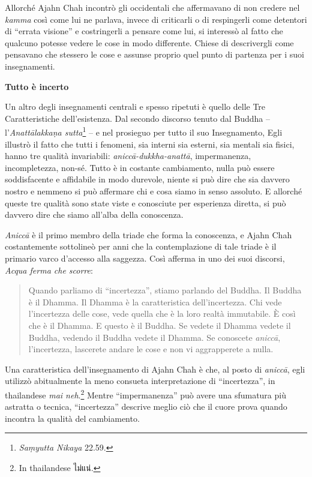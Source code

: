Allorché Ajahn Chah incontrò gli occidentali che affermavano di non
credere nel \emph{kamma} così come lui ne parlava, invece di criticarli
o di respingerli come detentori di ``errata visione'' e costringerli a
pensare come lui, si interessò al fatto che qualcuno potesse vedere le
cose in modo differente. Chiese di descrivergli come pensavano che
stessero le cose e assunse proprio quel punto di partenza per i suoi
insegnamenti.

\textbf{Tutto è incerto}

Un altro degli insegnamenti centrali e spesso ripetuti è quello delle
Tre Caratteristiche dell'esistenza. Dal secondo discorso tenuto dal
Buddha -- l'\emph{Anattālakkaṇa sutta}\footnote{\emph{Saṃyutta Nikaya}
  22.59.} -- e nel prosieguo per tutto il suo Insegnamento, Egli
illustrò il fatto che tutti i fenomeni, sia interni sia esterni, sia
mentali sia fisici, hanno tre qualità invariabili:
\emph{aniccā-dukkha-anattā}, impermanenza, incompletezza, non-sé. Tutto
è in costante cambiamento, nulla può essere soddisfacente e affidabile
in modo durevole, niente si può dire che sia davvero nostro e nemmeno si
può affermare chi e cosa siamo in senso assoluto. E allorché queste tre
qualità sono state viste e conosciute per esperienza diretta, si può
davvero dire che siamo all'alba della conoscenza.

\emph{Aniccā} è il primo membro della triade che forma la conoscenza, e
Ajahn Chah costantemente sottolineò per anni che la contemplazione di
tale triade è il primario varco d'accesso alla saggezza. Così afferma in
uno dei suoi discorsi, \emph{Acqua ferma che scorre}:

\begin{quote}
Quando parliamo di ``incertezza'', stiamo parlando del Buddha. Il Buddha
è il Dhamma. Il Dhamma è la caratteristica dell'incertezza. Chi vede
l'incertezza delle cose, vede quella che è la loro realtà immutabile. È
così che è il Dhamma. E questo è il Buddha. Se vedete il Dhamma vedete
il Buddha, vedendo il Buddha vedete il Dhamma. Se conoscete
\emph{aniccā}, l'incertezza, lascerete andare le cose e non vi
aggrapperete a nulla.
\end{quote}

Una caratteristica dell'insegnamento di Ajahn Chah è che, al posto di
\emph{aniccā}, egli utilizzò abitualmente la meno consueta
interpretazione di ``incertezza'', in thailandese \emph{mai
neh}.\footnote{In thailandese ไม่แน่.} Mentre ``impermanenza'' può avere
una sfumatura più astratta o tecnica, ``incertezza'' descrive meglio ciò
che il cuore prova quando incontra la qualità del cambiamento.

